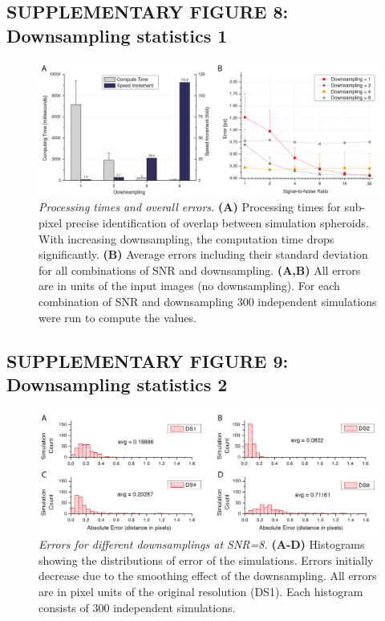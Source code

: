 \documentclass[]{spie}  %
\begin{document}
\subsection*{SUPPLEMENTARY FIGURE 8: Downsampling statistics 1}
\vspace{1mm}
\begin{figure}[h!]
\includegraphics[width=\textwidth]{fig-downsampling-statistics-0.png}
\vspace{-2.0mm}
\caption{\hspace{-0.5mm} \emph{Processing times and overall errors.} \textbf{(A)} Processing times for sub-pixel precise identification of overlap between simulation spheroids. With increasing downsampling, the computation time drops significantly. \textbf{(B)} Average errors including their standard deviation for all combinations of SNR and downsampling. \textbf{(A,B)} All errors are in units of the input images (no downsampling). For each combination of SNR and downsampling 300 independent simulations were run to compute the values.
}
\label{fig:sup-fig-downsampling-statistics-0}
\end{figure}

\subsection*{SUPPLEMENTARY FIGURE 9: Downsampling statistics 2}
\vspace{1mm}
\begin{figure}[h!]
\includegraphics[width=\textwidth]{fig-downsampling-statistics-1.png}
\vspace{-2.0mm}
\caption{\hspace{-0.5mm} \emph{Errors for different downsamplings at SNR=8.} \textbf{(A-D)} Histograms showing the distributions of error of the simulations. Errors initially decrease due to the smoothing effect of the downsampling. All errors are in pixel units of the original resolution (DS1). Each histogram consists of 300 independent simulations.
}
\label{fig:sup-fig-downsampling-statistics-1}
\end{figure}
\end{document}
